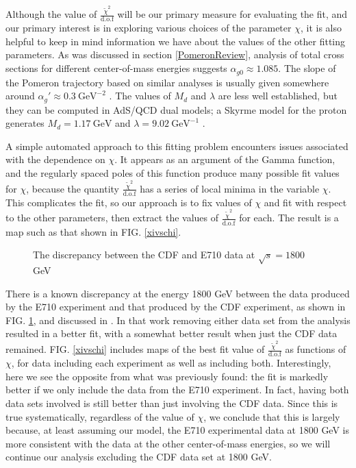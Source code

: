\documentclass[aps, prd, preprintnumbers, floatfix, showpacs, showkeys, nofootinbib, 10pt]{revtex4-1}
\begin{document}
Although the value of $\frac{\tilde{\chi}^2}{\mathrm{d.o.f}}$ will be our primary measure for evaluating the fit, and our primary interest is in exploring various choices of the parameter $\chi$, it is also helpful to keep in mind information we have about the values of the other fitting parameters.  As was discussed in section \ref{PomeronReview}, analysis of total cross sections for different center-of-mass energies suggests $\alpha_{g0} \approx 1.085$.  The slope of the Pomeron trajectory based on similar analyses is usually given somewhere around $\alpha_{g}' \approx 0.3 \ \mathrm{GeV}^{-2}$ \cite{CGM}.  The values of $M_d$ and $\lambda$ are less well established, but they can be computed in AdS/QCD dual models; a Skyrme model for the proton generates $M_d = 1.17 \ \mathrm{GeV}$ and $\lambda = 9.02 \ \mathrm{GeV}^{-1}$ \cite{DHM, Domokos:2010ma}.

A simple automated approach to this fitting problem encounters issues associated with the dependence on $\chi$.  It appears as an argument of the Gamma function, and the regularly spaced poles of this function produce many possible fit values for $\chi$, because the quantity $\frac{\tilde{\chi}^2}{\mathrm{d.o.f}}$ has a series of local minima in the variable $\chi$.  This complicates the fit, so our approach is to fix values of $\chi$ and fit with respect to the other parameters, then extract the values of $\frac{\tilde{\chi}^2}{\mathrm{d.o.f}}$ for each.  The result is a map such as that shown in FIG. \ref{xivschi}. 

\begin{figure}
\begin{center}
\caption{\label{datadiscrepancy} The discrepancy between the CDF and E710 data at $\sqrt{s} = 1800$ GeV}
\end{center}
\end{figure}

There is a known discrepancy at the energy 1800 GeV between the data produced by the E710 experiment and that produced by the CDF experiment, as shown in FIG. \ref{datadiscrepancy}, and discussed in \cite{DHM}.  In that work removing either data set from the analysis resulted in a better fit, with a somewhat better result when just the CDF data remained.  FIG. \ref{xivschi} includes maps of the best fit value of $\frac{\tilde{\chi}^2}{\mathrm{d.o.f}}$ as functions of $\chi$, for data including each experiment as well as including both.  Interestingly, here we see the opposite from what was previously found: the fit is markedly better if we only include the data from the E710 experiment.  In fact, having both data sets involved is still better than just involving the CDF data.  Since this is true systematically, regardless of the value of $\chi$, we conclude that this is largely because, at least assuming our model, the E710 experimental data at 1800 GeV is more consistent with the data at the other center-of-mass energies, so we will continue our analysis excluding the CDF data set at 1800 GeV.
\end{document}
